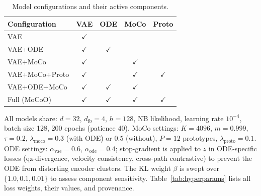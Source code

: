 \documentclass[biology,article,submit,pdftex]{Definitions/mdpi}
\begin{document}
\begin{table}[!t]
    \centering
    \caption{Model configurations and their active components.}
    \label{tab:configs}
    \begin{tabular}{lcccc}
        \toprule
        Configuration   & VAE          & ODE          & MoCo         & Proto \\
        \midrule
        VAE             & $\checkmark$ &              &              &              \\
        VAE+ODE         & $\checkmark$ & $\checkmark$ &              &              \\
        VAE+MoCo        & $\checkmark$ &              & $\checkmark$ &              \\
        VAE+MoCo+Proto  & $\checkmark$ &              & $\checkmark$ & $\checkmark$ \\
        VAE+ODE+MoCo    & $\checkmark$ & $\checkmark$ & $\checkmark$ &              \\
        Full (MoCoO)    & $\checkmark$ & $\checkmark$ & $\checkmark$ & $\checkmark$ \\
        \bottomrule
    \end{tabular}
\end{table}

All models share: $d = 32$, $d_{\mathrm{ib}} = 4$, $h = 128$, NB likelihood, learning rate $10^{-4}$, batch size 128, 200 epochs (patience 40). MoCo settings: $K = 4096$, $m = 0.999$, $\tau = 0.2$, $\lambda_{\mathrm{moco}} = 0.3$ (with ODE) or $0.5$ (without), $P = 12$ prototypes, $\lambda_{\mathrm{proto}} = 0.1$. ODE settings: $\alpha_{\mathrm{vae}} = 0.6$, $\alpha_{\mathrm{ode}} = 0.4$; stop-gradient is applied to $z$ in ODE-specific losses (qz-divergence, velocity consistency, cross-path contrastive) to prevent the ODE from distorting encoder clusters. The KL weight $\beta$ is swept over $\{1.0, 0.1, 0.01\}$ to assess component sensitivity. Table~\ref{tab:hyperparams} lists all loss weights, their values, and provenance.
\end{document}
